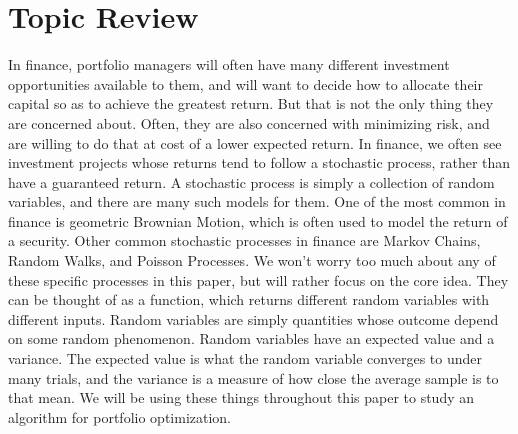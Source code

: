 \documentclass{article}
\begin{document}
\section{Topic Review}
In finance, portfolio managers will often have many different investment opportunities available to them, and will want to decide how to allocate their capital so as to achieve the greatest return.  But that is not the only thing they are concerned about.  Often, they are also concerned with minimizing risk, and are willing to do that at cost of a lower expected return. In finance, we often see investment projects whose returns tend to follow a stochastic process, rather than have a guaranteed return.  A stochastic process is simply a collection of random variables, and there are many such models for them.  One of the most common in finance is geometric Brownian Motion, which is often used to model the return of a security.  Other common stochastic processes in finance are Markov Chains, Random Walks, and Poisson Processes.  We won't worry too much about any of these specific processes in this paper, but will rather focus on the core idea.  They can be thought of as a function, which returns different random variables with different inputs.  Random variables are simply quantities whose outcome depend on some random phenomenon.  Random variables have an expected value and a variance.  The expected value is what the random variable converges to under many trials, and the variance is a measure of how close the average sample is to that mean.  We will be using these things throughout this paper to study an algorithm for portfolio optimization.  
\end{document}
